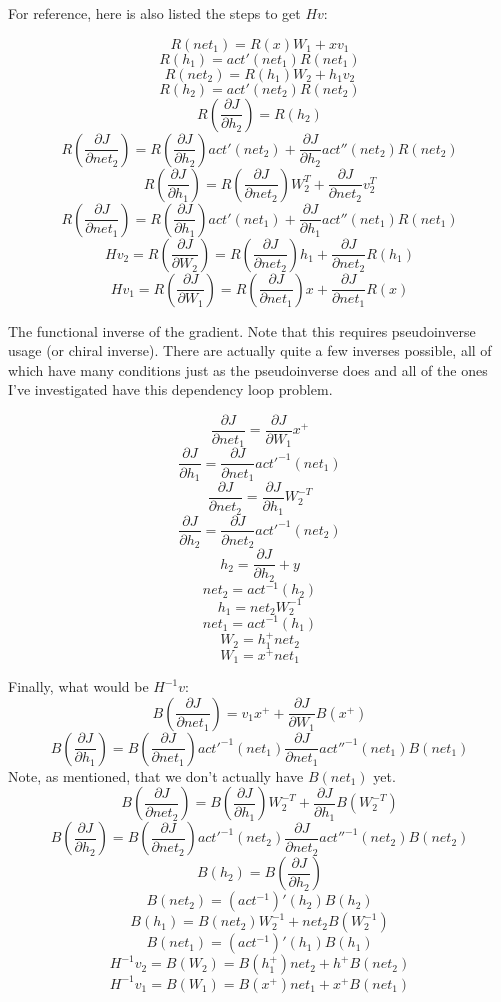 \documentclass{article}
\begin{document}
For reference, here is also listed the steps to get $Hv$:

$$ R(net_1) = R(x)W_1 + xv_1 $$
$$ R(h_1) = act'(net_1)R(net_1) $$
$$ R(net_2) = R(h_1)W_2 + h_1v_2 $$
$$ R(h_2) = act'(net_2)R(net_2) $$
$$ R(\frac{\partial J}{\partial h_2}) = R(h_2) $$
$$ R(\frac{\partial J}{\partial net_2}) = R(\frac{\partial J}{\partial h_2}) act'(net_2) +
        \frac{\partial J}{\partial h_2} act''(net_2) R(net_2)$$
$$ R(\frac{\partial J}{\partial h_1}) = R(\frac{\partial J}{\partial net_2}) W_2^T + \frac{\partial J}{\partial net_2} v_2^T $$
$$ R(\frac{\partial J}{\partial net_1}) = R(\frac{\partial J}{\partial h_1}) act'(net_1) +
        \frac{\partial J}{\partial h_1} act''(net_1) R(net_1)$$
$$ Hv_2 = R(\frac{\partial J}{\partial W_2}) = R(\frac{\partial J}{\partial net_2}) h_1 + \frac{\partial J}{\partial net_2} R(h_1)$$
$$ Hv_1 = R(\frac{\partial J}{\partial W_1}) = R(\frac{\partial J}{\partial net_1}) x + \frac{\partial J}{\partial net_1} R(x)$$

The functional inverse of the gradient. Note that this requires pseudoinverse usage (or chiral inverse). There are actually quite a few inverses possible, all of which have many conditions just as the pseudoinverse does and all of the ones I've investigated have this dependency loop problem.

$$ \frac{\partial J}{\partial net_1} = \frac{\partial J}{\partial W_1} x^+$$
$$ \frac{\partial J}{\partial h_1} = \frac{\partial J}{\partial net_1} act'^{-1}(net_1)$$
$$ \frac{\partial J}{\partial net_2} = \frac{\partial J}{\partial h_1} W_2^{-T} $$
$$ \frac{\partial J}{\partial h_2} = \frac{\partial J}{\partial net_2} act'^{-1}(net_2)$$
$$ h_2 = \frac{\partial J}{\partial h_2} + y$$
$$ net_2 = act^{-1}(h_2)$$
$$ h_1 = net_2 W_2^{-1}$$
$$ net_1 = act^{-1}(h_1)$$
$$ W_2 = h_1^+ net_2$$
$$ W_1 = x^+ net_1$$

Finally, what would be $H^{-1}v$:
$$ B(\frac{\partial J}{\partial net_1}) = v_1 x^+ + \frac{\partial J}{\partial W_1} B(x^+) $$
$$ B(\frac{\partial J}{\partial h_1}) = B(\frac{\partial J}{\partial net_1})act'^{-1}(net_1)
\frac{\partial J}{\partial net_1}act''^{-1}(net_1) B(net_1) $$
Note, as mentioned, that we don't actually have $B(net_1)$ yet.
$$ B(\frac{\partial J}{\partial net_2}) = B(\frac{\partial J}{\partial h_1}) W_2^{-T} + \frac{\partial J}{\partial h_1} B(W_2^{-T})$$
$$ B(\frac{\partial J}{\partial h_2}) = B(\frac{\partial J}{\partial net_2})act'^{-1}(net_2)
\frac{\partial J}{\partial net_2}act''^{-1}(net_2) B(net_2) $$
$$ B(h_2) = B(\frac{\partial J}{\partial h_2})$$
$$ B(net_2) = (act^{-1})'(h_2)B(h_2)$$
$$ B(h_1) = B(net_2) W_2^{-1} + net_2 B(W_2^{-1})$$
$$ B(net_1) = (act^{-1})'(h_1)B(h_1)$$
$$ H^{-1}v_2 = B(W_2) = B(h_1^+) net_2 + h^+ B(net_2)$$
$$ H^{-1}v_1 = B(W_1) = B(x^+) net_1 + x^+ B(net_1)$$
\end{document}

